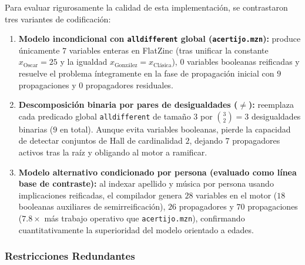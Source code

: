 Para evaluar rigurosamente la calidad de esta implementación, se contrastaron tres variantes de codificación:
\begin{enumerate}
    \item \textbf{Modelo incondicional con \texttt{alldifferent} global (\texttt{acertijo.mzn}):} produce únicamente $7$ variables enteras en FlatZinc (tras unificar la constante $x_{\text{Oscar}} = 25$ y la igualdad $x_{\text{González}} = x_{\text{Clásica}}$), $0$ variables booleanas reificadas y resuelve el problema íntegramente en la fase de propagación inicial con $9$ propagaciones y $0$ propagadores residuales.
    \item \textbf{Descomposición binaria por pares de desigualdades ($\neq$):} reemplaza cada predicado global \texttt{alldifferent} de tamaño $3$ por $\binom{3}{2} = 3$ desigualdades binarias ($9$ en total). Aunque evita variables booleanas, pierde la capacidad de detectar conjuntos de Hall de cardinalidad $2$, dejando $7$ propagadores activos tras la raíz y obligando al motor a ramificar.
    \item \textbf{Modelo alternativo condicionado por persona (evaluado como línea base de contraste):} al indexar apellido y música por persona usando implicaciones reificadas, el compilador genera $28$ variables en el motor ($18$ booleanas auxiliares de semirreificación), $26$ propagadores y $70$ propagaciones ($7.8\times$ más trabajo operativo que \texttt{acertijo.mzn}), confirmando cuantitativamente la superioridad del modelo orientado a edades.
\end{enumerate}

\subsubsection{Restricciones Redundantes}

